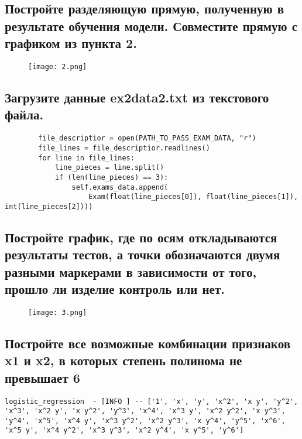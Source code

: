 \subsection{Постройте разделяющую прямую, полученную в результате обучения модели. Совместите прямую с графиком из пункта 2.}

\begin{figure}[h]
\centering
    \texttt{[image: 2.png]}
    \label{sec:purpose:payings}
\end{figure}

\subsection{Загрузите данные ex2data2.txt из текстового файла.}

\begin{lstlisting}
        file_descriptior = open(PATH_TO_PASS_EXAM_DATA, "r")
        file_lines = file_descriptior.readlines()
        for line in file_lines:
            line_pieces = line.split()
            if (len(line_pieces) == 3):
                self.exams_data.append(
                    Exam(float(line_pieces[0]), float(line_pieces[1]), int(line_pieces[2])))
\end{lstlisting}


\subsection{Постройте график, где по осям откладываются результаты тестов, а точки обозначаются двумя разными маркерами в зависимости от того, прошло ли изделие контроль или нет.}

\begin{figure}[h]
\centering
    \texttt{[image: 3.png]}
    \label{sec:purpose:payings}
\end{figure}


\subsection{Постройте все возможные комбинации признаков x1 и x2, в которых степень полинома не превышает 6}

\begin{lstlisting}
logistic_regression  - [INFO ] -- ['1', 'x', 'y', 'x^2', 'x y', 'y^2', 'x^3', 'x^2 y', 'x y^2', 'y^3', 'x^4', 'x^3 y', 'x^2 y^2', 'x y^3', 'y^4', 'x^5', 'x^4 y', 'x^3 y^2', 'x^2 y^3', 'x y^4', 'y^5', 'x^6', 'x^5 y', 'x^4 y^2', 'x^3 y^3', 'x^2 y^4', 'x y^5', 'y^6']
\end{lstlisting}

